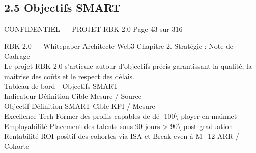 \documentclass[12pt,landscape,a4paper]{article}
\newenvironment{confidential}
{\begin{tcolorbox}[
    colback=rbkred!5!white,
    colframe=rbkred!75!black,
    title=CONFIDENTIEL,
    fonttitle=\bfseries\color{white},
    coltitle=rbkred!75!black,
    breakable,
    enhanced,
    frame hidden,
    borderline west={2pt}{0pt}{rbkred!75!black}
]}
{\end{tcolorbox}}
\begin{document}
\subsection{2.5 Objectifs SMART}
\vspace{0.5em}
\vspace{0.5em}
\begin{confidential}CONFIDENTIEL — PROJET RBK 2.0                                          Page 43 sur 316\end{confidential}
RBK 2.0 — Whitepaper Architecte Web3                                                                                          Chapitre 2. Stratégie : Note de Cadrage\\
\vspace{0.5em}
\vspace{0.5em}
\vspace{0.5em}
Le projet RBK 2.0 s’articule autour d’objectifs précis garantissant la qualité, la maîtrise des coûts et le respect des délais.\\
\vspace{0.5em}
Tableau de bord - Objectifs SMART\\
\vspace{0.5em}
\vspace{0.5em}
\vspace{0.5em}
Indicateur                                Définition                                Cible                                    Mesure / Source\\
Objectif                                  Définition SMART                          Cible                                    KPI / Mesure\\
Excellence Tech                           Former des profils capables de dé-        100\textbackslash{}%
ployer en mainnet\\
Employabilité                             Placement des talents sous 90 jours       \textgreater{} 90\textbackslash{}%
post-graduation\\
Rentabilité                               ROI positif des cohortes via ISA et       Break-even à M+12                        ARR / Cohorte\\
\vspace{0.5em}
\vspace{0.5em}
\vspace{0.5em}
\end{document}
